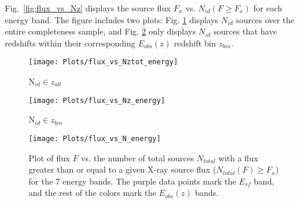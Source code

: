 \documentclass[fleqn,usenatbib]{mnras}
\begin{document}
    Fig.~\ref{fig:flux_vs_Nz} displays the source flux $F_{x}$ vs. $N_{id}(F \geq F_{x})$ for each energy band.  
    The figure includes two plots: Fig. \ref{fig:flux_vs_Nztot_energy} displays $N_{id}$ sources over the entire completeness sample, and Fig. \ref{fig:flux_vs_Nz_energy} only displays $N_{id}$ sources that have redshifts within their corresponding $E_{obs}(z)$ redshift bin $z_{bin}$.

		\begin{figure*}
		\centering
			\begin{subfigure}{0.5\textwidth}
			\texttt{[image: Plots/flux\_vs\_Nztot\_energy]}
			\caption{N$_{id} \in z_{all}$}
 			\label{fig:flux_vs_Nztot_energy}
			\end{subfigure}%
			\begin{subfigure}{0.5\textwidth}
  			\texttt{[image: Plots/flux\_vs\_Nz\_energy]}
  			\caption{N$_{id} \in z_{bin}$}
 			\label{fig:flux_vs_Nz_energy}
		    \end{subfigure}%
		\caption{Plot of flux $F$ vs. the number of identified sources $N_{id}$ with a flux greater than or equal to a given X-ray source flux $F_{x}$ ($N_{id}(F \geq F_{x})$) for the 7 energy bands. \textit{Left:} $N_{id}$ includes sources within the entire redshift range $0 < z < 3$. \textit{Right:} $N_{id}$ only includes sources that have redshifts within their corresponding $E_{obs}(z)$.}
		\label{fig:flux_vs_Nz}
		\end{figure*}
		

        \begin{figure}
        \centering
          \texttt{[image: Plots/flux\_vs\_N\_energy]}
          \caption{Plot of flux $F$ vs. the number of total sources $N_{total}$ with a flux greater than or equal to a given X-ray source flux ($N_{total}(F) \geq F_{x}$) for the 7 energy bands. The purple data points mark the $E_{rf}$ band, and the rest of the colors mark the $E_{obs}(z)$ bands.}
        \label{fig:flux_vs_N_energy}
        \end{figure}      
    
\end{document}
